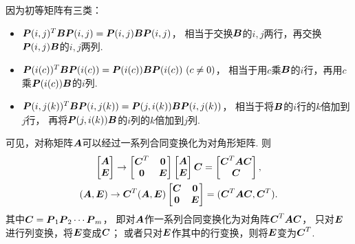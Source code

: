 \begin{theorem}
因为初等矩阵有三类：\begin{itemize}
	\item \(\boldsymbol{P}(i,j)^T\boldsymbol{B}\boldsymbol{P}(i,j)=\boldsymbol{P}(i,j)\boldsymbol{B}\boldsymbol{P}(i,j)\)，
	相当于交换\(\boldsymbol{B}\)的\(i,j\)两行，再交换\(\boldsymbol{P}(i,j)\boldsymbol{B}\)的\(i,j\)两列.
	\item \(\vb{P}(i(c))^T\vb{B}\vb{P}(i(c))=\vb{P}(i(c))\vb{B}\vb{P}(i(c))\ (c \neq 0)\)，
	相当于用\(c\)乘\(\boldsymbol{B}\)的\(i\)行，再用\(c\)乘\(\boldsymbol{P}(i(c))\boldsymbol{B}\)的\(i\)列.
	\item \(\boldsymbol{P}(i,j(k))^T\boldsymbol{B}\boldsymbol{P}(i,j(k))=\boldsymbol{P}(j,i(k))\boldsymbol{B}\boldsymbol{P}(i,j(k))\)，
	相当于将\(\boldsymbol{B}\)的\(i\)行的\(k\)倍加到\(j\)行，
	再将\(\boldsymbol{P}(j,i(k))\boldsymbol{B}\)的\(i\)列的\(k\)倍加到\(j\)列.
\end{itemize}
可见，对称矩阵\(\boldsymbol{A}\)可以经过一系列合同变换化为对角形矩阵.
则\begin{gather*}
	\begin{bmatrix} \boldsymbol{A} \\ \boldsymbol{E} \end{bmatrix}
	\to
	\begin{bmatrix} \boldsymbol{C}^T & \boldsymbol0 \\ \boldsymbol0 & \boldsymbol{E} \end{bmatrix}
	\begin{bmatrix} \boldsymbol{A} \\ \boldsymbol{E} \end{bmatrix}
	\boldsymbol{C}
	= \begin{bmatrix} \boldsymbol{C}^T\boldsymbol{A}\boldsymbol{C} \\ \boldsymbol{C} \end{bmatrix}, \\
	(\boldsymbol{A},\boldsymbol{E})
	\to
	\boldsymbol{C}^T (\boldsymbol{A},\boldsymbol{E}) \begin{bmatrix}
		\boldsymbol{C} & \boldsymbol0 \\
		\boldsymbol0 & \boldsymbol{E}
	\end{bmatrix}
	= (\boldsymbol{C}^T\boldsymbol{A}\boldsymbol{C},\boldsymbol{C}^T).
\end{gather*}
其中\(\boldsymbol{C}=\boldsymbol{P}_1\boldsymbol{P}_2\dotsm\boldsymbol{P}_m\)，
即对\(\boldsymbol{A}\)作一系列合同变换化为对角阵\(\boldsymbol{C}^T\boldsymbol{A}\boldsymbol{C}\)，
只对\(\boldsymbol{E}\)进行列变换，将\(\boldsymbol{E}\)变成\(\boldsymbol{C}\)；
或者只对\(\boldsymbol{E}\)作其中的行变换，则将\(\boldsymbol{E}\)变为\(\boldsymbol{C}^T\).
\end{theorem}


